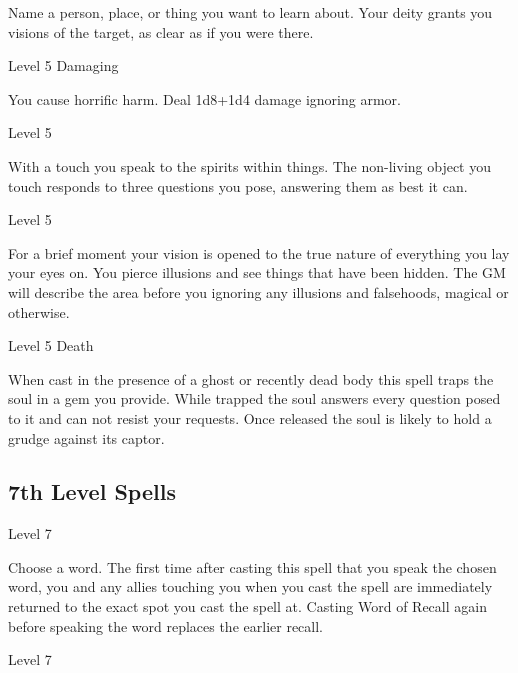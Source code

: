 Name a person, place, or thing you want to learn about. Your deity grants you visions of the target, as clear as if you were there.

       
\startSpellName
          	Level 5	Damaging
\stopSpellName
       

You cause horrific harm. Deal 1d8+1d4 damage ignoring armor.

       
\startSpellName
          	Level 5
\stopSpellName
       

With a touch you speak to the spirits within things. The non-living object you touch responds to three questions you pose, answering them as best it can.

       
\startSpellName
          	Level 5
\stopSpellName
       

For a brief moment your vision is opened to the true nature of everything you lay your eyes on. You pierce illusions and see things that have been hidden. The GM will describe the area before you ignoring any illusions and falsehoods, magical or otherwise.

       
\startSpellName
          	Level 5	Death
\stopSpellName
       

When cast in the presence of a ghost or recently dead body this spell traps the soul in a gem you provide. While trapped the soul answers every question posed to it and can not resist your requests. Once released the soul is likely to hold a grudge against its captor.

     

     

       
\subsection{7th Level Spells}     
       
\startSpellName
          	Level 7
\stopSpellName
       

Choose a word. The first time after casting this spell that you speak the chosen word, you and any allies touching you when you cast the spell are immediately returned to the exact spot you cast the spell at. Casting Word of Recall again before speaking the word replaces the earlier recall.

       
\startSpellName
          	Level 7
\stopSpellName
       


